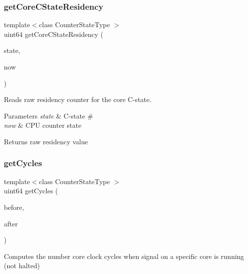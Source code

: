 \subsubsection{get\+Core\+C\+State\+Residency\hspace{0.1cm}{\footnotesize\ttfamily [2/2]}}
{\footnotesize\ttfamily template$<$class Counter\+State\+Type $>$ \\
uint64 get\+Core\+C\+State\+Residency (\begin{DoxyParamCaption}\item[{int}]{state,  }\item[{const Counter\+State\+Type \&}]{now }\end{DoxyParamCaption})\hspace{0.3cm}{\ttfamily [friend]}}



Reads raw residency counter for the core C-\/state. 


\begin{DoxyParams}{Parameters}
{\em state} & C-\/state \# \\
\hline
{\em now} & C\+PU counter state \\
\hline
\end{DoxyParams}
\begin{DoxyReturn}{Returns}
raw residency value 
\end{DoxyReturn}
\mbox{\label{classBasicCounterState_a5a3275c4f489a475f1658f4546567af4}} 
\subsubsection{get\+Cycles\hspace{0.1cm}{\footnotesize\ttfamily [1/2]}}
{\footnotesize\ttfamily template$<$class Counter\+State\+Type $>$ \\
uint64 get\+Cycles (\begin{DoxyParamCaption}\item[{const Counter\+State\+Type \&}]{before,  }\item[{const Counter\+State\+Type \&}]{after }\end{DoxyParamCaption})\hspace{0.3cm}{\ttfamily [friend]}}



Computes the number core clock cycles when signal on a specific core is running (not halted) 

